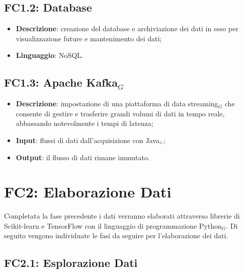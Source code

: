 \subsection{FC1.2: Database}\label{fasiProgettoAquisizioneDatiDatabase}

\begin{itemize}
	\item \textbf{Descrizione}: creazione del database e archiviazione dei dati in esso per visualizzazione future e mantenimento dei dati;
	\item \textbf{Linguaggio}: NoSQL.
\end{itemize}

\subsection{FC1.3: Apache Kafka$_G$}\label{fasiProgettoAquisizioneDatiApacheKafka}

\begin{itemize}
	\item \textbf{Descrizione}: impostazione di una piattaforma di data streaming$_G$ che consente di gestire e trasferire grandi volumi di dati in tempo reale, abbassando notevolmente i tempi di latenza;
	\item \textbf{Input}: flussi di dati dall'acquisizione con Java$_{\scaleto{G}{3pt}}$;
		\item \textbf{Output}: il flusso di dati rimane immutato.
\end{itemize}


\section{FC2: Elaborazione Dati}\label{fasiProgettoElaborazioneDati}
Completata la fase precedente i dati verranno elaborati attraverso librerie di Scikit-learn e TensorFlow con il linguaggio di programmazione Python$_G$.
Di seguito vengono individuate le fasi da seguire per l'elaborazione dei dati.

\subsection{FC2.1: Esplorazione Dati}\label{fasiProgettoElaborazioneDatiEsplorazioneDati}

